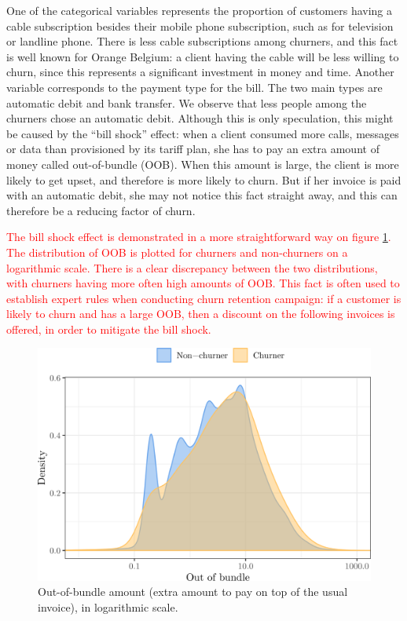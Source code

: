 One of the categorical variables represents the proportion of customers having a
cable subscription besides their mobile phone subscription, such as for
television or landline phone. There is less cable subscriptions among churners,
and this fact is well known for Orange Belgium: a client having the cable will
be less willing to churn, since this represents a significant investment in
money and time. Another variable corresponds to the payment type for the bill.
The two main types are automatic debit and bank transfer. We observe that less
people among the churners chose an automatic debit. Although this is only
speculation, this might be caused by the ``bill shock'' effect: when a client
consumed more calls, messages or data than provisioned by its tariff plan, she
has to pay an extra amount of money called out-of-bundle (OOB). When this amount
is large, the client is more likely to get upset, and therefore is more likely
to churn. But if her invoice is paid with an automatic debit, she may not notice
this fact straight away, and this can therefore be a reducing factor of churn.

\textcolor{red}{
The bill shock effect is demonstrated in a more straightforward way on figure
\ref{fig:oob}. The distribution of OOB is plotted for churners and
non-churners on a logarithmic scale. There is a clear discrepancy between the
two distributions, with churners having more often high amounts of OOB. This
fact is often used to establish expert rules when conducting churn retention
campaign: if a customer is likely to churn and has a large OOB, then a discount
on the following invoices is offered,  in order to mitigate the bill shock.
}

\begin{figure}
    \centering
	\includegraphics[width=0.9\linewidth]{figures/oob.png}
	\caption{Out-of-bundle amount (extra amount to pay on top of the usual
	invoice), in logarithmic scale.}
	\label{fig:oob}
\end{figure}

